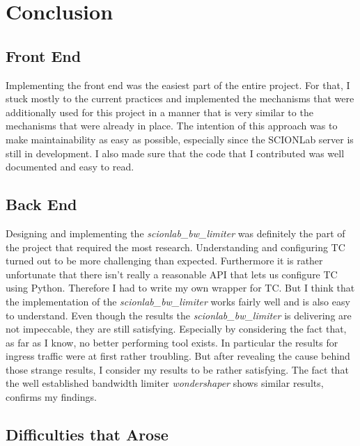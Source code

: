 \chapter{Conclusion}
\section{Front End}

Implementing the front end was the easiest part of the entire project. For that, I stuck mostly to the current practices and implemented the mechanisms that were additionally used for this project in a manner that is very similar to the mechanisms that were already in place. The intention of this approach was to make maintainability as easy as possible, especially since the \acs{SCIONLab} server is still in development. I also made sure that the code that I contributed was well documented and easy to read.

\section{Back End}

Designing and implementing the \textit{scionlab\_bw\_limiter} was definitely the part of the project that required the most research. Understanding and configuring \acs{TC} turned out to be more challenging than expected. Furthermore it is rather unfortunate that there isn't really a reasonable \acs{API} that lets us configure \acs{TC} using Python. Therefore I had to write my own wrapper for \acs{TC}. But I think that the implementation of the \textit{scionlab\_bw\_limiter} works fairly well and is also easy to understand. Even though the results the \textit{scionlab\_bw\_limiter} is delivering are not impeccable, they are still satisfying. Especially by considering the fact that, as far as I know, no better performing tool exists. In particular the results for ingress traffic were at first rather troubling. 
But after revealing the cause behind those strange results, I consider my results to be rather satisfying. 
The fact that the well established bandwidth limiter \textit{wondershaper} shows similar results, confirms my findings.

\newpage

\section{Difficulties that Arose}


